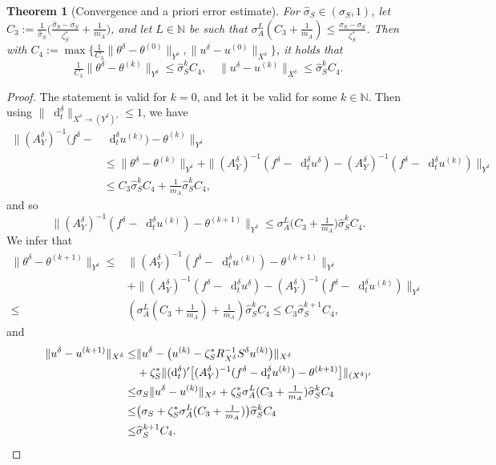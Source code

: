 \documentclass{amsart}
\newtheorem{theorem}{Theorem}[section]
\numberwithin{equation}{section}
\newcommand{\N}{\mathbb N}
\newcommand{\1}{\mathbb 1}
\newcommand*\diff{\mathop{}\!\mathrm{d}}
\newcommand{\be}{\begin{equation}}
\newcommand{\ee}{\end{equation}}
\begin{document}
\begin{theorem}[Convergence and a priori error estimate] \label{thm:Uzawa}
For $\widehat{\sigma}_S \in (\sigma_S,1)$, let $C_3:=\frac{1}{\widehat{\sigma}_S}\big(\frac{\widehat{\sigma}_S-\sigma_S}{\zeta_S^*}+\frac{1}{m_A}\big)$, and let $L \in \N$ be such that 
$\sigma_A^L(C_3+\frac{1}{m_A}) \leq \frac{\widehat{\sigma}_S-\sigma_S}{\zeta_S^*}$. Then with $C_4:=\max\{\frac{1}{C_3}\|\theta^\delta-\theta^{(0)}\|_{Y^\delta},\|u^\delta-u^{(0)}\|_{X^\delta}\}$, it holds that
\be \label{eq:uzawa}
\tfrac{1}{C_3} \|\theta^\delta-\theta^{(k)}\|_{Y^\delta} \leq \widehat{\sigma}_S^k C_4, \quad
\|u^\delta-u^{(k)}\|_{X^\delta} \leq \widehat{\sigma}_S^k C_4.
\ee
\end{theorem}

\begin{proof} The statement is valid for $k=0$, and let it be valid for some $k \in \N$.
Then using $\|\diff_t^\delta\|_{X^\delta \rightarrow (Y^\delta)'} \leq 1$, we have
\begin{align*}
\|(A_Y^{\delta})^{-1}(f^\delta-&\diff_t^\delta u^{(k)})-\theta^{(k)}\|_{Y^\delta}\\ &\leq
\|\theta^\delta-\theta^{(k)}\|_{Y^\delta}+\|(A_Y^{\delta})^{-1}(f^\delta-\diff_t^\delta u^\delta)-(A_Y^{\delta})^{-1}(f^\delta-\diff_t^\delta u^{(k)})\|_{Y^\delta}\\
&\leq C_3 \widehat{\sigma}_S^k C_4+ \tfrac{1}{m_A}  \widehat{\sigma}_S^k C_4,
\end{align*}
and so
$$
\|(A_Y^{\delta})^{-1}(f^\delta-\diff_t^\delta u^{(k)})-\theta^{(k+1)}\|_{Y^\delta} \leq \sigma_A^L \big(C_3+\tfrac{1}{m_A}\big) \widehat{\sigma}_S^k C_4.
$$
We infer that
\begin{align*}
\|\theta^\delta - \theta^{(k+1)}\|_{Y^\delta}  \leq& \|(A_Y^{\delta})^{-1}(f^\delta-\diff_t^\delta u^{(k)} )-\theta^{(k+1)}\|_{Y^\delta}\\
&+\|(A_Y^{\delta})^{-1}(f^\delta-\diff_t^\delta u^{\delta})-(A_Y^{\delta})^{-1}(f^\delta-\diff_t^\delta u^{(k)})\|_{Y^\delta}\\
 \leq &(\sigma_A^L(C_3 + \tfrac{1}{m_A})+\tfrac{1}{m_A})\widehat{\sigma}_S^k C_4 \leq C_3 \widehat{\sigma}_S^{k+1} C_4,
\end{align*}
and
\begin{align*}
\|u^\delta-u^{(k+1)}\|_{X^\delta} \leq & \|u^\delta-\big(u^{(k)}-\zeta_S^* R_{X^\delta}^{-1} S^\delta u^{(k)}\big)\|_{X^\delta}
\\
&+\zeta_S^* \|(\diff_t^\delta)'\big[(A_Y^\delta)^{-1}(f^\delta-\diff_t^\delta u^{(k)})-\theta^{(k+1)}\big]\|_{(X^\delta)'}\\
 \leq & \sigma_S \|u^\delta-u^{(k)}\|_{X^\delta}+ \zeta_S^* \sigma_A^L(C_3 + \tfrac{1}{m_A}) \widehat{\sigma}_S^k C_4\\
 \leq & \big(\sigma_S+\zeta_S^* \sigma_A^L(C_3 + \tfrac{1}{m_A})\big) \widehat{\sigma}_S^k C_4\\
\leq &\widehat{\sigma}_S^{k+1} C_4. \qedhere
\end{align*}
\end{proof}
\end{document}
